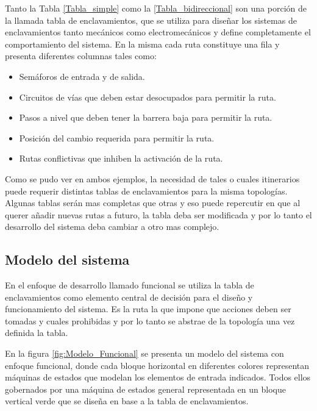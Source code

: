 	\vspace{5cm}
	
	Tanto la Tabla \ref{Tabla_simple} como la \ref{Tabla_bidireccional} son una porción de la llamada tabla de enclavamientos, que se utiliza para diseñar los sistemas de enclavamientos tanto mecánicos como electromecánicos y define completamente el comportamiento del sistema. En la misma cada ruta constituye una fila y presenta diferentes columnas tales como:
	
	\begin{itemize}
		\item Semáforos de entrada y de salida.
		\item Circuitos de vías que deben estar desocupados para permitir la ruta.
		\item Pasos a nivel que deben tener la barrera baja para permitir la ruta.
		\item Posición del cambio requerida para permitir la ruta.
		\item Rutas conflictivas que inhiben la activación de la ruta.
	\end{itemize}
	
	Como se pudo ver en ambos ejemplos, la necesidad de tales o cuales itinerarios puede requerir distintas tablas de enclavamientos para la misma topologías. Algunas tablas serán mas completas que otras y eso puede repercutir en que al querer añadir nuevas rutas a futuro, la tabla deba ser modificada y por lo tanto el desarrollo del sistema deba cambiar a otro mas complejo.
	
	\subsection{Modelo del sistema}
		
		En el enfoque de desarrollo llamado funcional se utiliza la tabla de enclavamientos como elemento central de decisión para el diseño y funcionamiento del sistema. Es la ruta la que impone que acciones deben ser tomadas y cuales prohibidas y por lo tanto se abstrae de la topología una vez definida la tabla.
			
		En la figura \ref{fig:Modelo_Funcional} se presenta un modelo del sistema con enfoque funcional, donde cada bloque horizontal en diferentes colores representan máquinas de estados que modelan los elementos de entrada indicados. Todos ellos gobernados por una máquina de estados general representada en un bloque vertical verde que se diseña en base a la tabla de enclavamientos. 	
		

